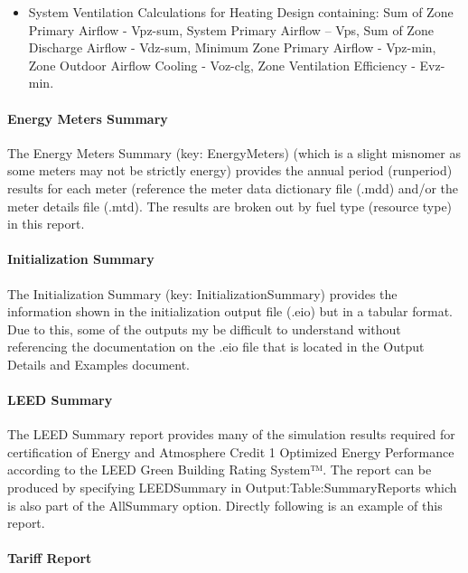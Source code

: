 \begin{itemize}
\item
  System Ventilation Calculations for Heating Design containing: Sum of Zone Primary Airflow - Vpz-sum, System Primary Airflow -- Vps, Sum of Zone Discharge Airflow - Vdz-sum, Minimum Zone Primary Airflow - Vpz-min, Zone Outdoor Airflow Cooling - Voz-clg, Zone Ventilation Efficiency - Evz-min.
\end{itemize}

\paragraph{Energy Meters Summary}\label{energy-meters-summary}

The Energy Meters Summary (key: EnergyMeters) (which is a slight misnomer as some meters may not be strictly energy) provides the annual period (runperiod) results for each meter (reference the meter data dictionary file (.mdd) and/or the meter details file (.mtd). The results are broken out by fuel type (resource type) in this report.

\paragraph{Initialization Summary}\label{initialization-summary}

The Initialization Summary (key: InitializationSummary) provides the information shown in the initialization output file (.eio) but in a tabular format. Due to this, some of the outputs my be difficult to understand without referencing the documentation on the .eio file that is located in the Output Details and Examples document.

\paragraph{LEED Summary}\label{leed-summary}

The LEED Summary report provides many of the simulation results required for certification of Energy and Atmosphere Credit 1 Optimized Energy Performance according to the LEED Green Building Rating System™. The report can be produced by specifying LEEDSummary in Output:Table:SummaryReports which is also part of the AllSummary option. Directly following is an example of this report.

\paragraph{Tariff Report}\label{TariffReport}

